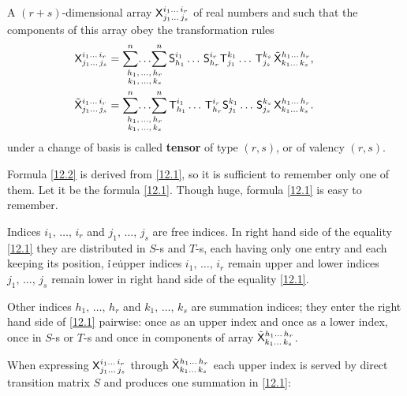 \begin{definition} A  $(r+s)$-dimensional array $\mathsf{X}^{i_1\dots\,i_r}_{j_1
\dots\,j_s}$ of real numbers and such that the components of this
array obey the transformation rules
\begin{align}
&\hskip -2em
\tsor{X}^{i_1\dots\,i_r}_{j_1\dots\,j_s}=\multsum \tsor{S}^{i_1}_{h_1}\dots\,\tsor{S}^{i_r}_{h_r}\tsor{T}^{k_1}_{j_1}
\dots\,\tsor{T}^{k_s}_{j_s}\,\tilde{ \tsor{X}}^{h_1\dots\,h_r}_{k_1\dots\,k_s},
\label{12.1}\\
&\hskip -2em
\tilde{\tsor{X}}^{i_1\dots\,i_r}_{j_1\dots\,j_s}=\multsum \tsor{T}^{i_1}_{h_1}\dots\,\tsor{T}^{i_r}_{h_r}\tsor{S}^{k_1}_{j_1}
\dots\,\tsor{S}^{k_s}_{j_s}\,\tsor{X}^{h_1\dots\,h_r}_{k_1\dots\,k_s}.
\label{12.2}
\end{align}
under a change of basis is called \textbf{tensor} of type $(r,s)$, or
of valency $(r,s)$.
\end{definition}
    Formula \ref{12.2} is derived from \ref{12.1}, so it is
sufficient to remember only one of them. Let it be the formula
\ref{12.1}. Though huge, formula \ref{12.1} is easy to
remember. 

    Indices $i_1,\,\dots,\,i_r$ and $j_1,\,\dots,\,j_s$
are free indices. In right hand side of the equality \ref{12.1}
they are distributed in $S$-s and $T$-s, each having only one
entry and each keeping its position, i\.\,e\. upper indices
$i_1,\,\dots,\,i_r$ remain upper and lower indices $j_1,\,
\dots,\,j_s$ remain lower in right hand side of the equality
\ref{12.1}.\par
    Other indices $h_1,\,\dots,\,h_r$ and $k_1,\,\dots,\,k_s$
are summation indices; they enter the right hand side of
\ref{12.1} pairwise: once as an upper index and once as a
lower index, once in $S$-s or $T$-s and once in components of
array $\tilde{ \mathsf{X}}^{h_1\dots\,h_r}_{k_1\dots\,k_s}$.\par
    When expressing $\mathsf{X}^{i_1\dots\,i_r}_{j_1\dots\,j_s}$ through
$\tilde{ \mathsf{X}}^{h_1\dots\,h_r}_{k_1\dots\,k_s}$ each upper index is
served by direct transition matrix $S$ and produces one summation
in \ref{12.1}:

